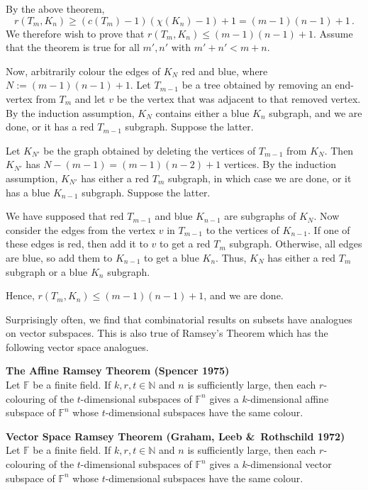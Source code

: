 \documentclass[a4paper]{article}
\let\oldendproof\endproof
\renewenvironment{proof}[1][\proofname]{%
  \oldproof[\scshape \noindent {\bfseries \text{Proof}}]%
}{\oldendproof}
\newenvironment{thm}[1]{
	\begin{framed}
	\noindent
	{\bfseries #1}\\}{
	\end{framed}
}
\newcommand{\FF}{\mathbb{F}}
\begin{document}
\begin{proof} By the above theorem,
\[
        r(T_m, K_n)
  \geq (c(T_m) - 1)(\chi(K_n) - 1) + 1
    =    (m-1)(n-1)+1\,.
\]
We therefore wish to prove that $r(T_m, K_n) \leq (m-1)(n-1)+1$.
Assume that the theorem is true for all $m', n'$ with $m' + n' < m + n$.

Now, arbitrarily colour the edges of $K_N$ red and blue, where $N:= (m-1)(n-1)+1$.
Let $T_{m-1}$ be a tree obtained by removing an end-vertex from $T_m$
and let $v$ be the vertex that was adjacent to that removed vertex.
By the induction assumption, $K_N$ contains either a blue $K_n$ subgraph, and we are done,
or it has a red $T_{m-1}$ subgraph. Suppose the latter.

Let $K_{N'}$ be the graph obtained by deleting the vertices of $T_{m-1}$ from $K_N$.
Then $K_{N'}$ has $N-(m-1) = (m-1)(n-2) +1$ vertices.
By the induction assumption, $K_{N'}$ has either a red $T_m$ subgraph,
in which case we are done, or it has a blue $K_{n-1}$ subgraph.
Suppose the latter.

We have supposed that red $T_{m-1}$ and blue $K_{n-1}$ are subgraphs of $K_N$.
Now consider the edges from the vertex $v$ in $T_{m-1}$ to the vertices of $K_{n-1}$.
If one of these edges is red, then add it to $v$ to get a red $T_m$ subgraph.
Otherwise, all edges are blue, so add them to $K_{n-1}$ to get a blue $K_n$.
Thus, $K_N$ has either a red $T_m$ subgraph or a blue $K_n$ subgraph.

Hence, $r(T_m, K_n) \leq (m-1)(n-1)+1$, and we are done.
\end{proof}

Surprisingly often, we find that combinatorial results on subsets have analogues on vector subspaces.
This is also true of Ramsey's Theorem which has the following vector space analogues.

\begin{thm}{The Affine Ramsey Theorem (Spencer 1975)}
  Let $\FF$ be a finite field.
  If $k,r,t \in \mathbb{N}$ and $n$ is sufficiently large,
  then each $r$-colouring of the $t$-dimensional subspaces of $\FF^n$ gives
  a $k$-dimensional affine subspace of $\FF^n$
  whose $t$-dimensional subspaces have the same colour.
\end{thm}

\begin{thm}{Vector Space Ramsey Theorem (Graham, Leeb \&\ Rothschild 1972)}
Let $\FF$ be a finite field.
If $k,r,t \in \mathbb{N}$ and $n$ is sufficiently large,
then each $r$-colouring of the $t$-dimensional subspaces of $\FF^n$ gives
a $k$-dimensional vector subspace of $\FF^n$
whose $t$-dimensional subspaces have the same colour.
\end{thm}
\end{document}
